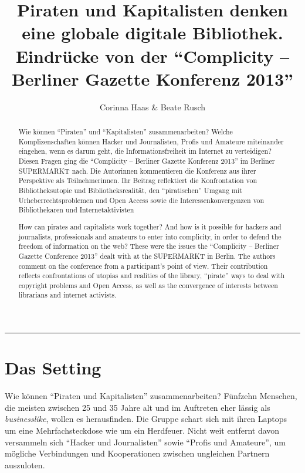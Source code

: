 \documentclass[a4paper,
fontsize=11pt,
oneside,
numbers=noperiodatend,
parskip=half-,
bibliography=totoc,
final
]{scrartcl}
\title{\LARGE{Piraten und Kapitalisten denken eine globale digitale Bibliothek. Eindrücke von der \enquote{Complicity – Berliner Gazette Konferenz 2013}}} %
\author{Corinna Haas \& Beate Rusch} %
\date{}
\begin{document}
\maketitle
\thispagestyle{fancyplain} 



\begin{center}
\end{center}

\begin{abstract}
\small
Wie können \enquote{Piraten} und \enquote{Kapitalisten} zusammenarbeiten? Welche Komplizenschaften können Hacker und Journalisten, Profis und Amateure miteinander eingehen, wenn es darum geht, die Informationsfreiheit im Internet zu verteidigen? Diesen Fragen ging die \enquote{Complicity – Berliner Gazette Konferenz 2013} im Berliner SUPERMARKT nach. Die Autorinnen kommentieren die Konferenz aus ihrer Perspektive als Teilnehmerinnen. Ihr Beitrag reflektiert die Konfrontation von Bibliotheksutopie und Bibliotheksrealität, den \enquote{piratischen} Umgang mit Urheberrechtsproblemen und Open Access sowie die Interessenkonvergenzen von Bibliothekaren und Internetaktivisten
\end{abstract}

\begin{abstract}
\small
How can pirates and capitalists work together? And how is it possible for hackers and journalists, professionals and amateurs to enter into complicity, in order to defend the freedom of information on the web? These were the issues the \enquote{Complicity – Berliner Gazette Conference 2013} dealt with at the SUPERMARKT in Berlin. The authors comment on the conference from a participant’s point of view. Their contribution reflects confrontations of utopias and realities of the library, \enquote{pirate} ways to deal with copyright problems and Open Access, as well as the convergence of interests between librarians and internet activists.
\end{abstract}

\begin{center}\rule{3in}{0.4pt}\end{center}


\section*{Das Setting}\label{das-setting}

Wie können \enquote{Piraten und Kapitalisten} zusammenarbeiten? Fünfzehn
Menschen, die meisten zwischen 25 und 35 Jahre alt und im Auftreten eher
lässig als \emph{businesslike}, wollen es herausfinden. Die Gruppe
schart sich mit ihren Laptops um eine Mehrfachsteckdose wie um ein
Herdfeuer. Nicht weit entfernt davon versammeln sich \enquote{Hacker und
Journalisten} sowie \enquote{Profis und Amateure}, um mögliche
Verbindungen und Kooperationen zwischen ungleichen Partnern auszuloten.
\end{document}
